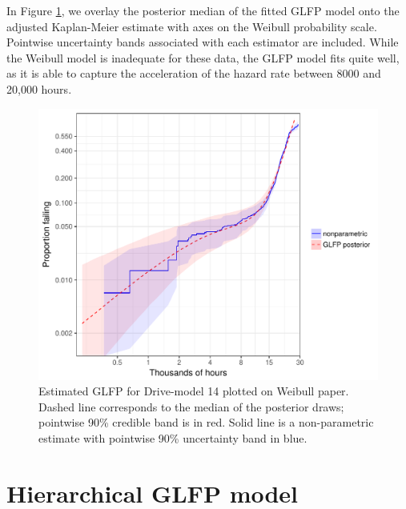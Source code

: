 \documentclass[12pt]{article}
\begin{document}
In Figure \ref{ex1-overlay}, we overlay the posterior median of the fitted GLFP model onto the adjusted Kaplan-Meier estimate with axes on the Weibull probability scale.  Pointwise uncertainty bands associated with each estimator are included. While the Weibull model is inadequate for these data, the GLFP model fits quite well, as it is able to capture the acceleration of the hazard rate between 8000 and 20,000 hours. %

\begin{figure}[H]
\centering
  \includegraphics[width=.8\textwidth]{km14-prob-plus}
  \caption{Estimated GLFP for Drive-model 14 plotted on Weibull paper.  Dashed line corresponds to the median of the posterior draws; pointwise 90\% credible band is in red.  Solid line is a non-parametric estimate with pointwise 90\% uncertainty band in blue.}
  \label{ex1-overlay}
\end{figure}


\section{Hierarchical GLFP model}
\label{sec:Hierarchical GLFP model}
\end{document}

